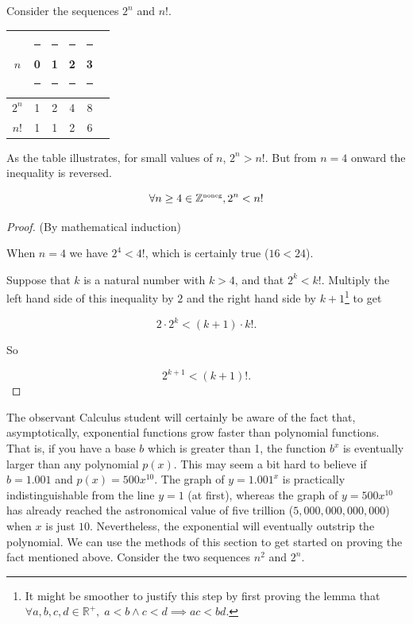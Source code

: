 Consider the sequences $2^n$ and $n!$.

\begin{center}
\begin{tabular}{c|ccccc}
$n$   & \rule{6pt}{0pt} 0 \rule{6pt}{0pt} & \rule{6pt}{0pt} 1 \rule{6pt}{0pt} &\rule{6pt}{0pt} 2 \rule{6pt}{0pt} & \rule{6pt}{0pt} 3 \rule{6pt}{0pt} & \\ \hline
$2^n$ & 1 & 2 & 4 & 8 & \\ \hline
$n!$  & 1 & 1 & 2 & 6 & \\
\end{tabular}
\end{center}

As the table illustrates, for small values of $n$, $2^n > n!$.  But from $n=4$
onward the inequality is reversed.

\begin{thm} 
\[ \forall n \geq 4 \in {\mathbb Z}^{\mbox{\tiny noneg}}, 2^n < n! \]
\end{thm}

\begin{proof} (By mathematical induction)

 When $n=4$ we have $2^4 < 4!$, which is certainly 
true ($16 < 24$).

 Suppose that $k$ is a natural number 
with $k > 4$, and that $2^k < k!$.  Multiply the left hand side of this
inequality by $2$ and the right hand side by $k+1$\footnote{It might be %
smoother to justify this step by first proving the lemma that %
$\forall a,b,c,d \in {\mathbb R}^+, \; a<b \land c<d \implies ac < bd$. } 
to get

\[ 2\cdot 2^{k} < (k+1) \cdot k!. \]

\noindent So

\[ 2^{k+1} < (k+1)!. \]

\end{proof}

The observant Calculus student will certainly be aware of the fact
that, asymptotically, exponential functions grow faster than polynomial
functions.  That is, if you have a base $b$ which is greater than 1, the 
function $b^x$ is eventually larger than any polynomial $p(x)$.  This
may seem a bit hard to believe if $b=1.001$ and $p(x) = 500x^{10}$.  The
graph of $y=1.001^x$ is practically indistinguishable from the line $y=1$
(at first), whereas the graph of $y=500x^{10}$ has already reached the 
astronomical value of five trillion ($5,000,000,000,000$) when $x$ is just
$10$.  Nevertheless, the exponential will eventually outstrip the polynomial.
We can use the methods of this section to get started on proving the fact 
mentioned above.  Consider the two sequences $n^2$ and $2^n$. 

